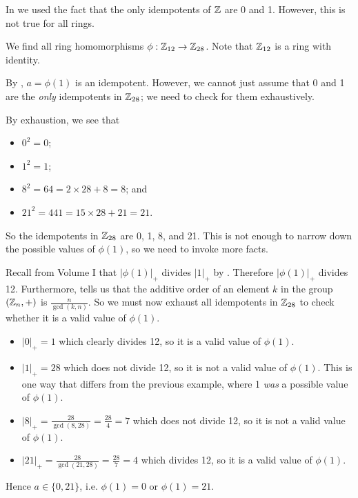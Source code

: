 In  we used the fact that the only idempotents of $\mathbb{Z}$ are 0 and 1. However, this is not true for all rings.

\begin{example}\label{example-homomorphisms-from-Z12-to-Z28}
    We find all ring homomorphisms $\phi: \mathbb{Z}_{12} \to \mathbb{Z}_{28}$. Note that $\mathbb{Z}_{12}$ is a ring with identity.

    By , $a = \phi(1)$ is an idempotent. However, we cannot just assume that 0 and 1 are the \textit{only} idempotents in $\mathbb{Z}_{28}$; we need to check for them exhaustively.

    \newpage

    By exhaustion, we see that
    \begin{itemize}
        \item $0^2 = 0$;
        \item $1^2 = 1$;
        \item $8^2 = 64 = 2 \times 28 + 8 = 8$; and
        \item $21^2 = 441 = 15 \times 28 + 21 = 21$.
    \end{itemize}
    So the idempotents in $\mathbb{Z}_{28}$ are 0, 1, 8, and 21. This is not enough to narrow down the possible values of $\phi(1)$, so we need to invoke more facts.

    Recall from Volume I that $|\phi(1)|_+$ divides $|1|_+$ by . Therefore $|\phi(1)|_+$ divides 12. Furthermore,  tells us that the additive order of an element $k$ in the group $(\mathbb{Z}_n, +)$ is $\frac{n}{\gcd(k,n)}$. So we must now exhaust all idempotents in $\mathbb{Z}_{28}$ to check whether it is a valid value of $\phi(1)$.
    \begin{itemize}
        \item $|0|_+ = 1$ which clearly divides 12, so it is a valid value of $\phi(1)$.
        \item $|1|_+ = 28$ which does not divide 12, so it is not a valid value of $\phi(1)$. This is one way that differs from the previous example, where 1 \textit{was} a possible value of $\phi(1)$.
        \item $|8|_+ = \frac{28}{\gcd(8,28)} = \frac{28}4 = 7$ which does not divide 12, so it is not a valid value of $\phi(1)$.
        \item $|21|_+ = \frac{28}{\gcd(21,28)} = \frac{28}7 = 4$ which divides 12, so it is a valid value of $\phi(1)$.
    \end{itemize}
    Hence $a \in \{0, 21\}$, i.e. $\phi(1) = 0$ or $\phi(1) = 21$.


\end{example}
